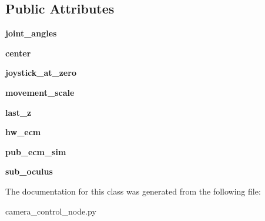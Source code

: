 \subsection*{Public Attributes}
\begin{DoxyCompactItemize}
\item 
\hypertarget{classcamera__control__node_1_1Oculus_a674d456ebe0c26ad445e69c3c723d7cd}{{\bfseries joint\-\_\-angles}}\label{classcamera__control__node_1_1Oculus_a674d456ebe0c26ad445e69c3c723d7cd}

\item 
\hypertarget{classcamera__control__node_1_1Oculus_a0396d5a5a959b98a1f861b3ca964b5c5}{{\bfseries center}}\label{classcamera__control__node_1_1Oculus_a0396d5a5a959b98a1f861b3ca964b5c5}

\item 
\hypertarget{classcamera__control__node_1_1Oculus_ae11938b01123c1acf99d9c060f0a7473}{{\bfseries joystick\-\_\-at\-\_\-zero}}\label{classcamera__control__node_1_1Oculus_ae11938b01123c1acf99d9c060f0a7473}

\item 
\hypertarget{classcamera__control__node_1_1Oculus_a963a6efe4d9f8cec5791d82982f24ae4}{{\bfseries movement\-\_\-scale}}\label{classcamera__control__node_1_1Oculus_a963a6efe4d9f8cec5791d82982f24ae4}

\item 
\hypertarget{classcamera__control__node_1_1Oculus_a63ab92999bada1b51d0cdc67afd88909}{{\bfseries last\-\_\-z}}\label{classcamera__control__node_1_1Oculus_a63ab92999bada1b51d0cdc67afd88909}

\item 
\hypertarget{classcamera__control__node_1_1Oculus_aacfe5ec1cad6156dc390c95ac9fbf81f}{{\bfseries hw\-\_\-ecm}}\label{classcamera__control__node_1_1Oculus_aacfe5ec1cad6156dc390c95ac9fbf81f}

\item 
\hypertarget{classcamera__control__node_1_1Oculus_a34a40cdc4926c4fca15158d4c897fe83}{{\bfseries pub\-\_\-ecm\-\_\-sim}}\label{classcamera__control__node_1_1Oculus_a34a40cdc4926c4fca15158d4c897fe83}

\item 
\hypertarget{classcamera__control__node_1_1Oculus_ac7ac9c36491facca6f646c8e5494ec7e}{{\bfseries sub\-\_\-oculus}}\label{classcamera__control__node_1_1Oculus_ac7ac9c36491facca6f646c8e5494ec7e}

\end{DoxyCompactItemize}


The documentation for this class was generated from the following file\-:\begin{DoxyCompactItemize}
\item 
camera\-\_\-control\-\_\-node.\-py\end{DoxyCompactItemize}
